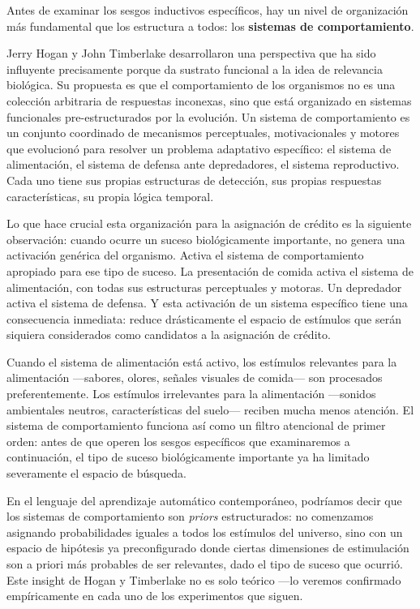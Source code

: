 \documentclass[
  letterpaper,
  DIV=11,
  numbers=noendperiod]{scrreprt}
\begin{document}
\begin{tcolorbox}[enhanced jigsaw, toprule=.15mm, arc=.35mm, colback=white, opacityback=0, colframe=quarto-callout-note-color-frame, breakable, rightrule=.15mm, left=2mm, leftrule=.75mm, bottomrule=.15mm]
Antes de examinar los sesgos inductivos específicos, hay un nivel de
organización más fundamental que los estructura a todos: los
\textbf{sistemas de comportamiento}.

Jerry Hogan y John Timberlake desarrollaron una perspectiva que ha sido
influyente precisamente porque da sustrato funcional a la idea de
relevancia biológica. Su propuesta es que el comportamiento de los
organismos no es una colección arbitraria de respuestas inconexas, sino
que está organizado en sistemas funcionales pre-estructurados por la
evolución. Un sistema de comportamiento es un conjunto coordinado de
mecanismos perceptuales, motivacionales y motores que evolucionó para
resolver un problema adaptativo específico: el sistema de alimentación,
el sistema de defensa ante depredadores, el sistema reproductivo. Cada
uno tiene sus propias estructuras de detección, sus propias respuestas
características, su propia lógica temporal.

Lo que hace crucial esta organización para la asignación de crédito es
la siguiente observación: cuando ocurre un suceso biológicamente
importante, no genera una activación genérica del organismo. Activa el
sistema de comportamiento apropiado para ese tipo de suceso. La
presentación de comida activa el sistema de alimentación, con todas sus
estructuras perceptuales y motoras. Un depredador activa el sistema de
defensa. Y esta activación de un sistema específico tiene una
consecuencia inmediata: reduce drásticamente el espacio de estímulos que
serán siquiera considerados como candidatos a la asignación de crédito.

Cuando el sistema de alimentación está activo, los estímulos relevantes
para la alimentación ---sabores, olores, señales visuales de comida---
son procesados preferentemente. Los estímulos irrelevantes para la
alimentación ---sonidos ambientales neutros, características del
suelo--- reciben mucha menos atención. El sistema de comportamiento
funciona así como un filtro atencional de primer orden: antes de que
operen los sesgos específicos que examinaremos a continuación, el tipo
de suceso biológicamente importante ya ha limitado severamente el
espacio de búsqueda.

En el lenguaje del aprendizaje automático contemporáneo, podríamos decir
que los sistemas de comportamiento son \emph{priors} estructurados: no
comenzamos asignando probabilidades iguales a todos los estímulos del
universo, sino con un espacio de hipótesis ya preconfigurado donde
ciertas dimensiones de estimulación son a priori más probables de ser
relevantes, dado el tipo de suceso que ocurrió. Este insight de Hogan y
Timberlake no es solo teórico ---lo veremos confirmado empíricamente en
cada uno de los experimentos que siguen.


\end{tcolorbox}
\end{document}
